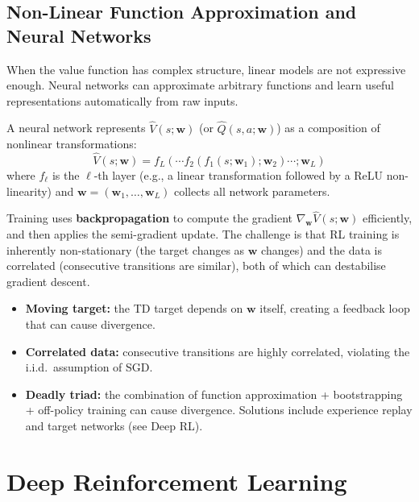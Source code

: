 \documentclass[11pt,a4paper]{article}
\newcommand{\term}[1]{\textcolor{DefGreen}{\textbf{#1}}}
\begin{document}
\subsection{Non-Linear Function Approximation and Neural Networks}

When the value function has complex structure, linear models are not expressive enough. Neural networks can approximate arbitrary functions and learn useful representations automatically from raw inputs.

A neural network represents $\hat{V}(s;\mathbf{w})$ (or $\hat{Q}(s,a;\mathbf{w})$) as a composition of nonlinear transformations:
\[
\hat{V}(s;\mathbf{w}) = f_L(\cdots f_2(f_1(s;\mathbf{w}_1);\mathbf{w}_2)\cdots;\mathbf{w}_L)
\]
where $f_\ell$ is the $\ell$-th layer (e.g., a linear transformation followed by a ReLU non-linearity) and $\mathbf{w} = (\mathbf{w}_1,\ldots,\mathbf{w}_L)$ collects all network parameters.

Training uses \term{backpropagation} to compute the gradient $\nabla_\mathbf{w}\hat{V}(s;\mathbf{w})$ efficiently, and then applies the semi-gradient update. The challenge is that RL training is inherently non-stationary (the target changes as $\mathbf{w}$ changes) and the data is correlated (consecutive transitions are similar), both of which can destabilise gradient descent.

\begin{warnbox}
\begin{itemize}
  \item \textbf{Moving target:} the TD target depends on $\mathbf{w}$ itself, creating a feedback loop that can cause divergence.
  \item \textbf{Correlated data:} consecutive transitions are highly correlated, violating the i.i.d.\ assumption of SGD.
  \item \textbf{Deadly triad:} the combination of function approximation + bootstrapping + off-policy training can cause divergence. Solutions include experience replay and target networks (see Deep RL).
\end{itemize}
\end{warnbox}

\section{Deep Reinforcement Learning}
\end{document}
